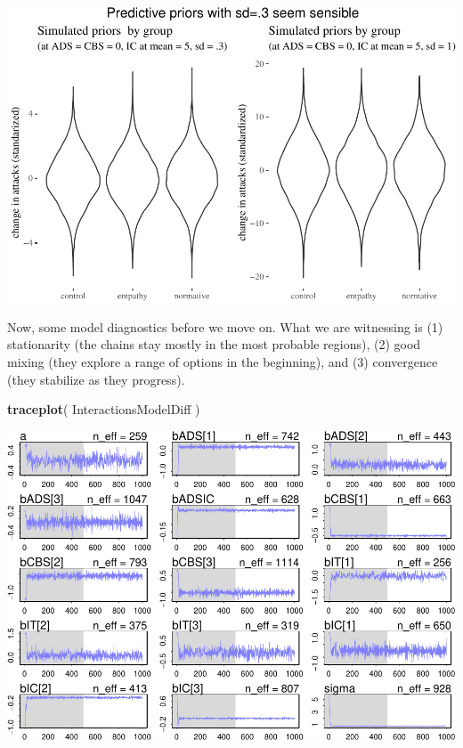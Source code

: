 \documentclass[10pt,dvipsnames,enabledeprecatedfontcommands]{scrartcl}
\newenvironment{Shaded}{\begin{snugshade}}{\end{snugshade}}
\newcommand{\KeywordTok}[1]{\textcolor[rgb]{0.13,0.29,0.53}{\textbf{#1}}}
\newcommand{\NormalTok}[1]{#1}
\begin{document}
\begin{center}\includegraphics[width=1\linewidth]{bayesianReport_files/figure-latex/unnamed-chunk-7-1} \end{center}
\normalsize

Now, some model diagnostics before we move on. What we are witnessing is
(1) stationarity (the chains stay mostly in the most probable regions),
(2) good mixing (they explore a range of options in the beginning), and
(3) convergence (they stabilize as they progress).

\vspace{1mm}
\footnotesize

\begin{Shaded}
\begin{Highlighting}[]
\KeywordTok{traceplot}\NormalTok{( InteractionsModelDiff )}
\end{Highlighting}
\end{Shaded}

\begin{center}\includegraphics[width=1\linewidth]{bayesianReport_files/figure-latex/unnamed-chunk-8-1} \end{center}
\normalsize
\end{document}

